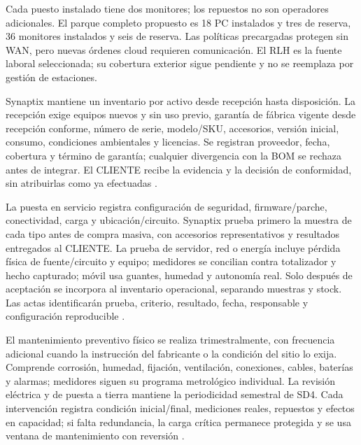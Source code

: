 Cada puesto instalado tiene dos monitores; los repuestos no son operadores adicionales. El parque completo propuesto es 18 PC instalados y tres de reserva, 36 monitores instalados y seis de reserva. Las políticas precargadas protegen sin WAN, pero nuevas órdenes cloud requieren comunicación. El RLH es la fuente laboral seleccionada; su cobertura exterior sigue pendiente y no se reemplaza por gestión de estaciones.





Synaptix mantiene un inventario por activo desde recepción hasta disposición. La recepción exige equipos nuevos y sin uso previo, garantía de fábrica vigente desde recepción conforme, número de serie, modelo/SKU, accesorios, versión inicial, consumo, condiciones ambientales y licencias. Se registran proveedor, fecha, cobertura y término de garantía; cualquier divergencia con la BOM se rechaza antes de integrar. El CLIENTE recibe la evidencia y la decisión de conformidad, sin atribuirlas como ya efectuadas \parencite[RT-08.06/16, pp.~19--20]{pucv-transversal}.

La puesta en servicio registra configuración de seguridad, firmware/parche, conectividad, carga y ubicación/circuito. Synaptix prueba primero la muestra de cada tipo antes de compra masiva, con accesorios representativos y resultados entregados al CLIENTE. La prueba de servidor, red o energía incluye pérdida física de fuente/circuito y equipo; medidores se concilian contra totalizador y hecho capturado; móvil usa guantes, humedad y autonomía real. Solo después de aceptación se incorpora al inventario operacional, separando muestras y stock. Las actas identificarán prueba, criterio, resultado, fecha, responsable y configuración reproducible \parencite[RT-08.15/16, pp.~19--20]{pucv-transversal}.

El mantenimiento preventivo físico se realiza trimestralmente, con frecuencia adicional cuando la instrucción del fabricante o la condición del sitio lo exija. Comprende corrosión, humedad, fijación, ventilación, conexiones, cables, baterías y alarmas; medidores siguen su programa metrológico individual. La revisión eléctrica y de puesta a tierra mantiene la periodicidad semestral de SD4. Cada intervención registra condición inicial/final, mediciones reales, repuestos y efectos en capacidad; si falta redundancia, la carga crítica permanece protegida y se usa ventana de mantenimiento con reversión \parencites[RT-06.10, p.~15; RT-08.16, p.~20]{pucv-transversal}.

